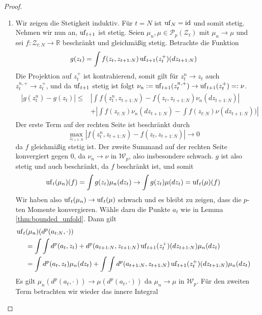 \begin{proof}
\begin{enumerate}
    \item Wir zeigen die Stetigkeit induktiv. Für $t=N$ ist $\operatorname{uf}_N=\operatorname{id}$ und somit stetig. Nehmen wir nun an, $\operatorname{uf}_{t+1}$ ist stetig. Seien $\mu_n, \mu\in\mathcal{P}_p(\mathcal{Z}_t)$ mit $\mu_n\rightarrow \mu$ und sei $f:\mathcal{Z}_{t:N}\rightarrow\mathbb{R}$ beschränkt und gleichmäßig stetig. Betrachte die Funktion 
    $$g(z_t)=\int f(z_t, z_{t+1:N}) \operatorname{uf}_{t+1}(z_t^+)(dz_{t+1:N})$$
    Die Projektion auf $z_t^+$ ist kontrahierend, somit gilt für $z_t^n\rightarrow z_t$ auch $z_t^{n,+}\rightarrow z_t^+$, und da $\operatorname{uf}_{t+1}$ stetig ist folgt $\nu_n:=\operatorname{uf}_{t+1}(z_t^{n,+})\rightarrow \operatorname{uf}_{t+1}(z_t^+)=:\nu$. 
    \begin{align}\label{eq:g_continuous}
        \begin{split}
        |g(z_t^n)-g(z_t)| \leq &\left|\int f(z_t^n, z_{t+1:N})-f(z_t,z_{t+1:N})\nu_n(dz_{t+1:N})\right| \\
        &+ \left|\int f(z_{t:N})\nu_n(dz_{t+1:N}) - \int f(z_{t:N})\nu(dz_{t+1:N}))\right|
        \end{split}
    \end{align}
    Der erste Term auf der rechten Seite ist beschränkt durch 
    $$\max\limits_{z_{t+1:N}}\left|f(z_t^n, z_{t+1:N})-f(z_t, z_{t+1:N})\right|\rightarrow 0$$
    da $f$ gleichmäßig stetig ist. Der zweite Summand auf der rechten Seite konvergiert gegen $0$, da $\nu_n \rightarrow \nu$ in $\mathcal{W}_p$, also insbesondere schwach. $g$ ist also stetig und auch beschränkt, da $f$ beschränkt ist, und somit
    $$\operatorname{uf}_t(\mu_n)(f)=\int g(z_t)\mu_n(dz_t)\rightarrow \int g(z_t)\mu(dz_t)=\operatorname{uf}_t(\mu)(f)$$
    Wir haben also $\operatorname{uf}_t(\mu_n)\rightarrow\operatorname{uf}_t(\mu)$ schwach und es bleibt zu zeigen, dass die $p$-ten Momente konvergieren. Wähle dazu die Punkte $a_t$ wie in Lemma \ref{thm:bounded_unfold}. Dann gilt
    \begin{align*}
        \operatorname{uf}_{t}&(\mu_n)(d^p(a_{t:N}, \cdot)) \\
        &= \int\int d^p(a_t, z_t) + d^p(a_{t+1:N}, z_{t+1:N})\operatorname{uf}_{t+1}(z_t^+)(dz_{t+1:N})\mu_n(dz_t) \\
        &=\int d^p(a_t, z_t)\mu_n(dz_t) + \int\int d^p(a_{t+1:N}, z_{t+1:N})\operatorname{uf}_{t+1}(z_t^+)(dz_{t+1:N})\mu_n(dz_t)
    \end{align*}
    Es gilt $\mu_n(d^p(a_t, \cdot))\rightarrow \mu(d^p(a_t, \cdot))$ da $\mu_n\rightarrow\mu$ in $\mathcal{W}_p$.
    Für den zweiten Term betrachten wir wieder das innere Integral

\end{enumerate}
\end{proof}
